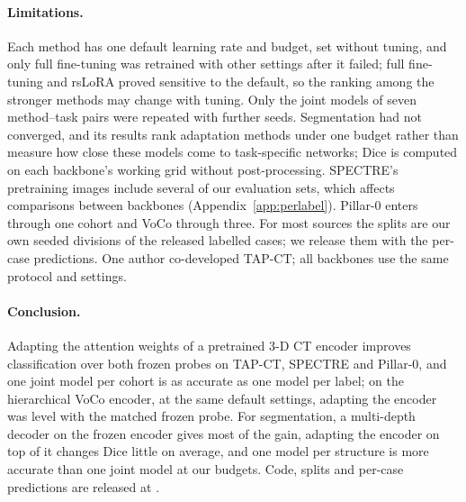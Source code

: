 \paragraph{Limitations.} Each method has one default learning rate and budget, set without tuning, and only full fine-tuning was retrained with other settings after it failed; full fine-tuning and rsLoRA proved sensitive to the default, so the ranking among the stronger methods may change with tuning. Only the joint models of seven method--task pairs were repeated with further seeds. Segmentation had not converged, and its results rank adaptation methods under one budget rather than measure how close these models come to task-specific networks; Dice is computed on each backbone's working grid without post-processing. SPECTRE's pretraining images include several of our evaluation sets, which affects comparisons between backbones (Appendix~\ref{app:perlabel}). Pillar-0 enters through one cohort and VoCo through three. For most sources the splits are our own seeded divisions of the released labelled cases; we release them with the per-case predictions. One author co-developed TAP-CT; all backbones use the same protocol and settings.

\paragraph{Conclusion.} Adapting the attention weights of a pretrained 3-D CT encoder improves classification over both frozen probes on TAP-CT, SPECTRE and Pillar-0, and one joint model per cohort is as accurate as one model per label; on the hierarchical VoCo encoder, at the same default settings, adapting the encoder was level with the matched frozen probe. For segmentation, a multi-depth decoder on the frozen encoder gives most of the gain, adapting the encoder on top of it changes Dice little on average, and one model per structure is more accurate than one joint model at our budgets. Code, splits and per-case predictions are released at .
